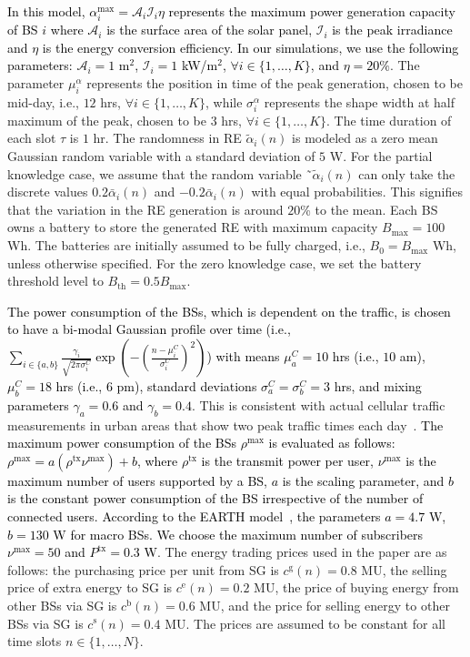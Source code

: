 \documentclass[10pt, letter,twocolumn]{IEEEtran}
\begin{document}
\normalsize
\textcolor{black}{In this model, $\alpha_{i}^{\max} = \mathcal{A}_{i}\mathcal{I}_{i}\eta$ represents the maximum power generation capacity of BS $i$ where $\mathcal{A}_{i}$ is the surface area of the solar panel, $\mathcal{I}_{i}$ is the peak irradiance and $\eta$ is the energy conversion efficiency. In our simulations, we use the following parameters: $\mathcal{A}_{i} = 1$ m$^2$, $\mathcal{I}_{i} = 1$ kW/m$^{2}$, $\forall i \in \{1,\ldots,K\}$, and $\eta = 20 \%$}. The parameter $\mu_{i}^{\alpha}$ represents the position in time of the peak generation, chosen to be mid-day, i.e., $12$ hrs, $\forall i \in \{1,\ldots,K\}$, while $\sigma_{i}^{\alpha}$ represents the shape width at half maximum of the peak, chosen to be $3$ hrs, $\forall i \in \{1,\ldots,K\}$. The time duration of each slot $\tau$ is $1$ hr. The randomness in RE $\tilde{\alpha}_{i}(n)$ is modeled as a zero mean Gaussian random variable with a standard deviation of $5$ W. For the partial knowledge case, we assume that the random variable ˜$\tilde{\alpha}_{i}(n)$ can only take the discrete values $0.2\bar{\alpha}_{i}(n)$ and $-0.2\bar{\alpha}_{i}(n)$ with equal probabilities. This signifies that the variation in the RE generation is around $20$\% to the mean. Each BS owns a battery to store the generated RE with maximum capacity $B_{\max} = 100$ Wh. The batteries are initially assumed to be fully charged, i.e., $B_{0}= B_{\max}$ Wh, unless otherwise specified. For the zero knowledge case, we set the battery threshold level to $B_{\text{th}} = 0.5 B_{\max}$.

\textcolor{black}{The power consumption of the BSs, which is dependent on the traffic, is chosen to have a bi-modal Gaussian profile over time (i.e., $\sum_{i \in \{a,b\}} \frac{\gamma_i}{\sqrt{2 \pi \sigma_i^C}} \exp(-  \left( \frac{n - \mu_i^C}{\sigma_i^C}\right)^2 )$) with means $\mu_{a}^{C} = 10$ hrs (i.e., $10$ am), $\mu_{b}^{C} = 18$ hrs (i.e., $6$ pm), standard deviations $\sigma_{a}^{C} = \sigma_{b}^{C} = 3$ hrs, and mixing parameters $\gamma_a = 0.6$ and $\gamma_b = 0.4$}. This is consistent with actual cellular traffic measurements in urban areas that show two peak traffic times each day~\cite{traffic_model}. \textcolor{black}{The maximum power consumption of the BSs $\rho^{\max}$ is evaluated as follows: $\rho^{\max} = a (\rho^{\text{tx}}\nu^{\max}) + b$, where $\rho^{\text{tx}}$ is the transmit power per user, $\nu^{\max}$ is the maximum number of users supported by a BS, $a$ is the scaling parameter, and $b$ is the constant power consumption of the BS irrespective of the number of connected users. According to the EARTH model~\cite{EARTH}, the parameters $a = 4.7$ W, $b = 130$ W for macro BSs. We choose the maximum number of subscribers $\nu^{\max} = 50$ and $P^{\text{tx}} = 0.3$ W}. The energy trading prices used in the paper are as follows: the purchasing price per unit from SG is $c^{\text{g}}(n) = 0.8$ MU, the selling price of extra energy to SG is $c^{\text{e}}(n) = 0.2$ MU, the price of buying energy from other BSs via SG is $c^{\text{b}}(n) = 0.6$ MU, and the price for selling energy to other BSs via SG is $c^{\text{s}}(n) = 0.4$ MU. The prices are assumed to be constant for all time slots $n \in \{1,\ldots,N\}$.
\end{document}
